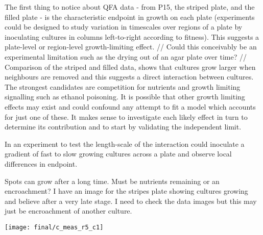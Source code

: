 The first thing to notice about QFA data - from P15, the striped
plate, and the filled plate - is the characteristic endpoint in growth
on each plate (experiments could be designed to study variation in
timescales over regions of a plate by inoculating cultures in columns
left-to-right according to fitness). This suggests a plate-level or
region-level growth-limiting effect.
//
Could this conceivably be an experimental limitation such as the
drying out of an agar plate over time?
//
Comparison of the striped and filled data, shows that cultures grow
larger when neighbours are removed and this suggests a direct
interaction between cultures. The strongest candidates are competition
for nutrients and growth limiting signalling such as ethanol
poisoning. It is possible that other growth limiting effects may exist
and could confound any attempt to fit a model which accounts for just
one of these. It makes sense to investigate each likely effect in turn
to determine its contribution and to start by validating the
independent limit.

In an experiment to test the length-scale of the interaction could
inoculate a gradient of fast to slow growing cultures across a plate
and observe local differences in endpoint.


Spots can grow after a long time. Must be nutrients remaining or an
encroachment? I have an image for the stripes plate showing cultures
growing and believe after a very late stage. I need to check the data
images but this may just be encroachment of another culture.
\graphicspath{{images/stripes/}}
\begin{Figure}
  \centering
  \texttt{[image: final/c\_meas\_r5\_c1]}
  \label{fig:kn_guessing}
\end{Figure}


